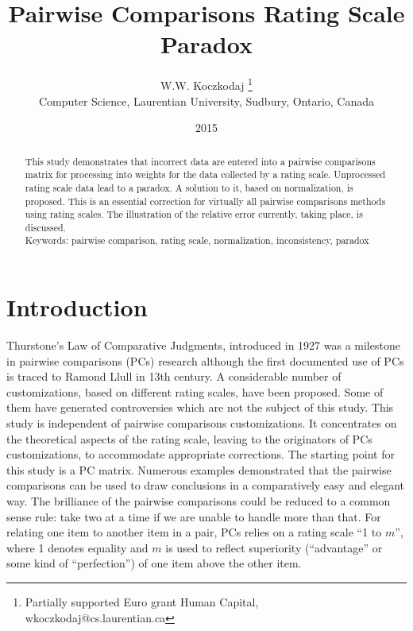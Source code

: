 \documentclass [12pt]{article}
\begin{document}
\title{Pairwise Comparisons Rating Scale Paradox}

\author{W.W. Koczkodaj \footnote{Partially supported Euro grant Human Capital, wkoczkodaj@cs.laurentian.ca}\\
 Computer Science, Laurentian University,  Sudbury, Ontario, Canada}
 
\date{2015}
\maketitle
\begin{abstract}
This study demonstrates that incorrect data are entered into a pairwise comparisons matrix for processing into weights for the data collected by a rating scale. 
Unprocessed rating scale data lead to a paradox. A solution to it, based on normalization, is proposed. This is an essential correction for virtually all pairwise comparisons methods using rating scales. The illustration of the relative error currently, taking place, is discussed. \\

\noindent Keywords: pairwise comparison, rating scale, normalization, inconsistency, paradox \\ \end{abstract}

\section{Introduction}

Thurstone's Law of Comparative Judgments, introduced \cite{Thurstone1927} in 1927 was a milestone in pairwise comparisons (PCs) research although the first documented use of PCs is traced to Ramond Llull in 13th century. A considerable number of customizations, based on different rating scales, have been proposed. Some of them have generated controversies which are not the subject of this study. This study is independent of pairwise comparisons customizations. It concentrates on the theoretical aspects of the rating scale, leaving to the originators of PCs customizations, to accommodate appropriate corrections. The starting point for this study is a PC matrix. Numerous examples demonstrated that the pairwise comparisons can be used to draw conclusions in a comparatively easy and elegant way. The brilliance of the pairwise comparisons could be reduced to a common sense rule: take two at a time if we are unable to handle more than that. For relating one item to another item in a pair, PCs relies on a rating scale ``1 to $m$'', where 1 denotes equality and $m$ is used to reflect superiority (``advantage'' or some kind of ``perfection'') of one item above the other item.
\end{document}
